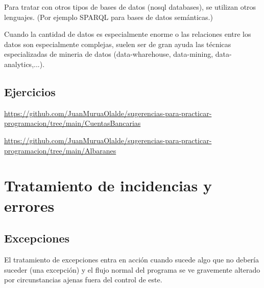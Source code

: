 \documentclass[spanish,12pt,a4paper,final,oneside]{book}
\begin{document}
Para tratar con otros tipos de bases de datos (nosql databases), se utilizan otros lenguajes. (Por ejemplo SPARQL para bases de datos semánticas.)

Cuando la cantidad de datos es especialmente enorme o las relaciones entre los datos son especialmente complejas, suelen ser de gran ayuda las técnicas especializadas de mineria de datos (data-wharehouse, data-mining, data-analytics,...).

\section{Ejercicios}

\url{https://github.com/JuanMuruaOlalde/sugerencias-para-practicar-programacion/tree/main/CuentasBancarias}

\url{https://github.com/JuanMuruaOlalde/sugerencias-para-practicar-programacion/tree/main/Albaranes}

\chapter{Tratamiento de incidencias y errores}

\section{Excepciones}
El tratamiento de excepciones entra en acción cuando sucede algo que no debería suceder (una excepción) y el flujo normal del programa se ve gravemente alterado por circunstancias ajenas fuera del control de este.
\end{document}
